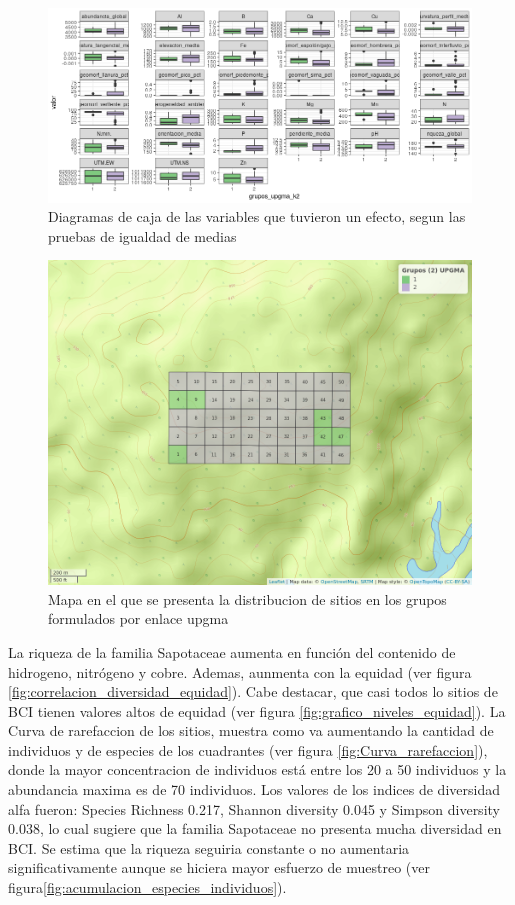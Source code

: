 \documentclass[11pt,]{article}
\begin{document}
\begin{figure}
\centering
\includegraphics[width=1.00000\textwidth]{actualizacion2_grupos_upgma.png}
\caption{Diagramas de caja de las variables que tuvieron un efecto,
segun las pruebas de igualdad de medias\label{fig:grupos_upgma}}
\end{figure}

\begin{figure}
\centering
\includegraphics{mapa_upgma_k2.png}
\caption{Mapa en el que se presenta la distribucion de sitios en los
grupos formulados por enlace upgma\label{fig:mapa_upgma_k2}}
\end{figure}

La riqueza de la familia Sapotaceae aumenta en función del contenido de
hidrogeno, nitrógeno y cobre. Ademas, aunmenta con la equidad (ver
figura \ref{fig:correlacion_diversidad_equidad}). Cabe destacar, que
casi todos lo sitios de BCI tienen valores altos de equidad (ver figura
\ref{fig:grafico_niveles_equidad}). La Curva de rarefaccion de los
sitios, muestra como va aumentando la cantidad de individuos y de
especies de los cuadrantes (ver figura \ref{fig:Curva_rarefaccion}),
donde la mayor concentracion de individuos está entre los 20 a 50
individuos y la abundancia maxima es de 70 individuos. Los valores de
los indices de diversidad alfa fueron: Species Richness 0.217, Shannon
diversity 0.045 y Simpson diversity 0.038, lo cual sugiere que la
familia Sapotaceae no presenta mucha diversidad en BCI. Se estima que la
riqueza seguiria constante o no aumentaria significativamente aunque se
hiciera mayor esfuerzo de muestreo (ver
figura\ref{fig:acumulacion_especies_individuos}).
\end{document}
